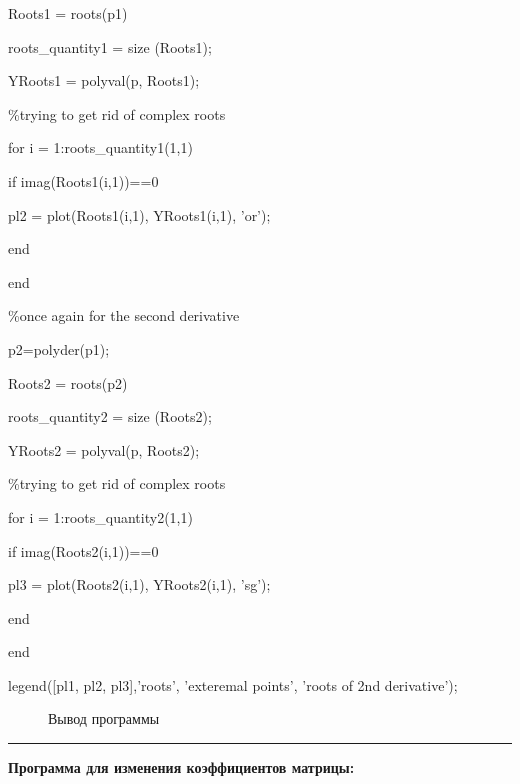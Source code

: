 \documentclass[a4paper,12pt]{article}
\begin{document}
Roots1 = roots(p1)\par
roots\_quantity1 = size (Roots1);\par
YRoots1 = polyval(p, Roots1);\par
{\color{green}
\%trying to get rid of complex roots}\par
for i = 1:roots\_quantity1(1,1)\par
\hspace{10pt}if imag(Roots1(i,1))==0\par
\hspace{10pt}\hspace{10pt}pl2 = plot(Roots1(i,1), YRoots1(i,1), 'or');\par
\hspace{10pt}end\par
end\par
\par
{\color{green}
\%once again for the second derivative}\par
p2=polyder(p1);\par
Roots2 = roots(p2)\par
roots\_quantity2 = size (Roots2);\par
YRoots2 = polyval(p, Roots2);\par
{\color{green}
\%trying to get rid of complex roots}\par
for i = 1:roots\_quantity2(1,1)\par
\hspace{10pt}if imag(Roots2(i,1))==0\par
\hspace{10pt}\hspace{10pt}pl3 = plot(Roots2(i,1), YRoots2(i,1), 'sg');\par
\hspace{10pt}end\par
end\par

legend([pl1, pl2, pl3],'roots', 'exteremal points', 'roots of 2nd derivative');\par

\begin{figure}[H]
\caption{Вывод программы}
\label{graph}
\end{figure}



\hrule

\newpage
\large \textbf{Программа для изменения коэффициентов матрицы:}\par
\normalsize
\end{document}
